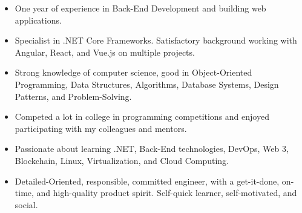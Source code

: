 





\begin{itemize}
    \item One year of experience in Back-End Development and building web applications.
    \item Specialist in .NET Core Frameworks. Satisfactory background working with Angular, React, and Vue.js on multiple projects.
    \item Strong knowledge of computer science, good in Object-Oriented Programming, Data Structures, Algorithms, Database Systems, Design Patterns, and Problem-Solving.
    \item Competed a lot in college in programming competitions and enjoyed participating with my colleagues and mentors.
    \item Passionate about learning .NET, Back-End technologies, DevOps, Web 3, Blockchain, Linux, Virtualization, and Cloud Computing.
    \item Detailed-Oriented, responsible, committed engineer, with a get-it-done, on-time, and high-quality product spirit. Self-quick learner, self-motivated, and social.
\end{itemize}